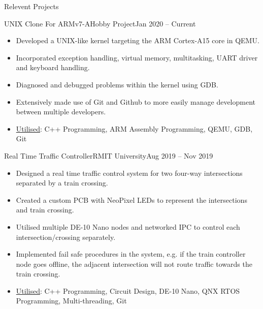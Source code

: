 \documentclass[]{mcdowellcv}
\begin{document}
	\begin{cvsection}{Relevent Projects}
		\begin{cvsubsection}{UNIX Clone For ARMv7-A}{Hobby Project}{Jan 2020 -- Current}
			\begin{itemize}
				\item Developed a UNIX-like kernel targeting the ARM Cortex-A15 core in QEMU.
				\item Incorporated exception handling, virtual memory, multitasking, UART driver and keyboard handling.
				\item Diagnosed and debugged problems within the kernel using GDB.
				\item Extensively made use of Git and Github to more easily manage development between multiple developers.
				\item \underline{Utilised}: C++ Programming, ARM Assembly Programming, QEMU, GDB, Git
			\end{itemize}
		\end{cvsubsection}

		\begin{cvsubsection}{Real Time Traffic Controller}{RMIT University}{Aug 2019 -- Nov 2019}
			\begin{itemize}
				\item Designed a real time traffic control system for two four-way intersections separated by a train crossing.
				\item Created a custom PCB with NeoPixel LEDs to represent the intersections and train crossing.
				\item Utilised multiple DE-10 Nano nodes and networked IPC to control each intersection/crossing separately.
				\item Implemented fail safe procedures in the system, e.g. if the train controller node goes offline, the adjacent intersection will not route traffic towards the train crossing.
				\item \underline{Utilised}: C++ Programming, Circuit Design, DE-10 Nano, QNX RTOS Programming, Multi-threading, Git
			\end{itemize}
		\end{cvsubsection}


\end{cvsection}
\end{document}
